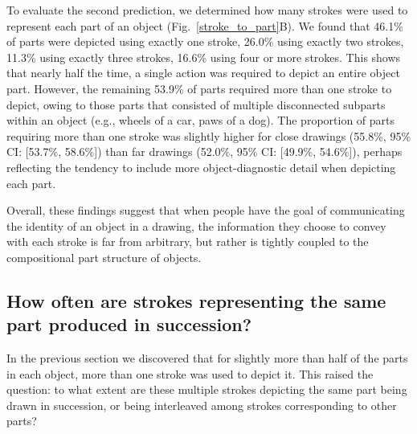 \documentclass[10pt,letterpaper]{article}
\newcommand{\jefan}[1]{{\color{blue}{[jefan: #1]}}}
\begin{document}
To evaluate the second prediction, we determined how many strokes were used to represent each part of an object (Fig.~\ref{stroke_to_part}B). 
We found that 46.1\% of parts were depicted using exactly one stroke, 26.0\% using exactly two strokes, 11.3\% using exactly three strokes, 16.6\% using four or more strokes. 
This shows that nearly half the time, a single action was required to depict an entire object part. 
However, the remaining 53.9\% of parts required more than one stroke to depict, owing to those parts that consisted of multiple disconnected subparts within an object (e.g., wheels of a car, paws of a dog).
\jefan{This should be verified in some way by subsetting on those feature columns that actually are likely to contain multiple instances per object.}
The proportion of parts requiring more than one stroke was slightly higher for close drawings (55.8\%, 95\% CI: [53.7\%, 58.6\%]) than far drawings (52.0\%, 95\% CI: [49.9\%, 54.6\%]), perhaps reflecting the tendency to include more object-diagnostic detail when depicting each part. 

Overall, these findings suggest that when people have the goal of communicating the identity of an object in a drawing, the information they choose to convey with each stroke is far from arbitrary, but rather is tightly coupled to the compositional part structure of objects. 

\subsection{How often are strokes representing the same part produced in succession?}

In the previous section we discovered that for slightly more than half of the parts in each object, more than one stroke was used to depict it. 
This raised the question: to what extent are these multiple strokes depicting the same part being drawn in succession, or being interleaved among strokes corresponding to other parts?
\end{document}
